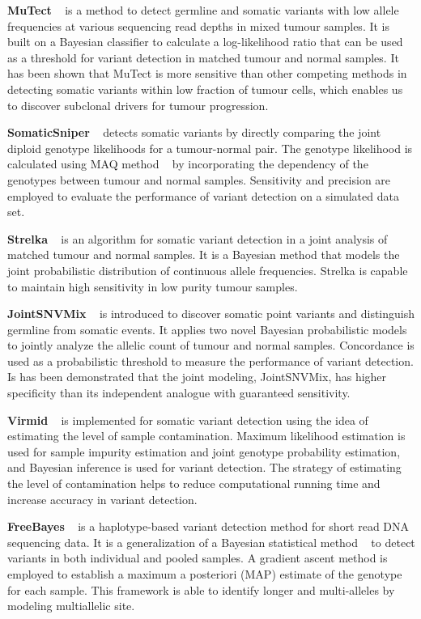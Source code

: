 \documentclass[11pt,reqno]{amsart}
\begin{document}
\textbf{MuTect} ~\citep{Cibulskis2013} is a method to detect germline and somatic variants with low allele frequencies at various sequencing read depths in mixed tumour samples.
It is built on a Bayesian classifier to calculate a log-likelihood ratio that can be used as a threshold for variant detection in matched tumour and normal samples.
It has been shown that MuTect is more sensitive than other competing methods in detecting somatic variants within low fraction of tumour cells, which enables us to discover subclonal drivers for tumour progression.

\textbf{SomaticSniper} ~\citep{Larson2012} detects somatic variants by directly comparing the joint diploid genotype likelihoods for a tumour-normal pair.
The genotype likelihood is calculated using MAQ method ~\citep{Li2008} by incorporating the dependency of the genotypes between tumour and normal samples.
Sensitivity and precision are employed to evaluate the performance of variant detection on a simulated data set.

\textbf{Strelka} ~\citep{Saunders2012} is an algorithm for somatic variant detection in a joint analysis of matched tumour and normal samples.
It is a Bayesian method that models the joint probabilistic distribution of continuous allele frequencies.
Strelka is capable to maintain high sensitivity in low purity tumour samples.

\textbf{JointSNVMix} ~\citep{Roth2012} is introduced to discover somatic point variants and distinguish germline from somatic events.
It applies two novel Bayesian probabilistic models to jointly analyze the allelic count of tumour and normal samples.
Concordance is used as a probabilistic threshold to measure the performance of variant detection.
Is has been demonstrated that the joint modeling, JointSNVMix, has higher specificity than its independent analogue with guaranteed sensitivity.

\textbf{Virmid} ~\citep{Kim2013} is implemented for somatic variant detection using the idea of estimating the level of sample contamination.
Maximum likelihood estimation is used for sample impurity estimation and joint genotype probability estimation, and Bayesian inference is used for variant detection.
The strategy of estimating the level of contamination helps to reduce computational running time and increase accuracy in variant detection.

\textbf{FreeBayes} ~\citep{Garrison2012} is a haplotype-based variant detection method for short read DNA sequencing data.
It is a generalization of a Bayesian statistical method ~\citep{marth1999general} to detect variants in both individual and pooled samples.
A gradient ascent method is employed to establish a maximum a posteriori (MAP) estimate of the genotype for each sample.
This framework is able to identify longer and multi-alleles by modeling multiallelic site.
\end{document}
